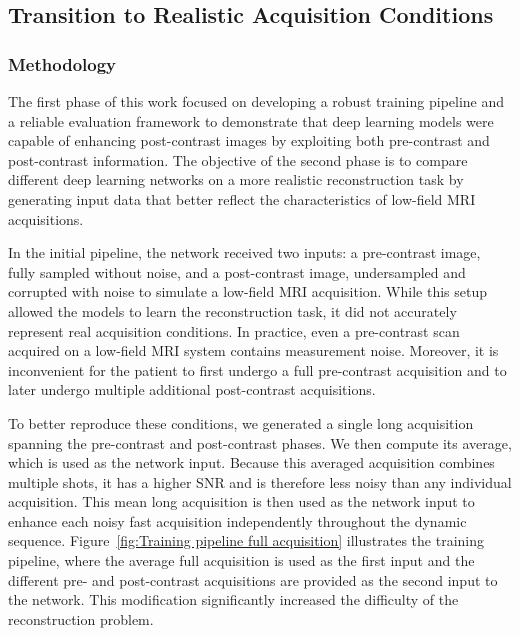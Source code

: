 \documentclass[12pt]{article}
\begin{document}
\subsection{Transition to Realistic Acquisition Conditions} 

\subsubsection{Methodology} 

The first phase of this work focused on developing a robust training pipeline and a reliable evaluation framework to demonstrate that deep learning models were capable of enhancing post-contrast images by exploiting both pre-contrast and post-contrast information.
The objective of the second phase is to compare different deep learning networks on a more realistic reconstruction task by generating input data that better reflect the characteristics of low-field MRI acquisitions.
\vspace{0.5cm}

In the initial pipeline, the network received two inputs: a pre-contrast image, fully sampled without noise, and a post-contrast image, undersampled and corrupted with noise to simulate a low-field MRI acquisition. 
While this setup allowed the models to learn the reconstruction task, it did not accurately represent real acquisition conditions. 
In practice, even a pre-contrast scan acquired on a low-field MRI system contains measurement noise.
Moreover, it is inconvenient for the patient to first undergo a full pre-contrast acquisition and to later undergo multiple additional post-contrast acquisitions.
\vspace{0.5cm}

To better reproduce these conditions, we generated a single long acquisition spanning the pre-contrast and post-contrast phases.
We then compute its average, which is used as the network input.
Because this averaged acquisition combines multiple shots, it has a higher SNR and is therefore less noisy than any individual acquisition.
This mean long acquisition is then used as the network input to enhance each noisy fast acquisition independently throughout the dynamic sequence.
Figure~\ref{fig:Training pipeline full acquisition} illustrates the training pipeline, where the average full acquisition is used as the first input and the different pre- and post-contrast acquisitions are provided as the second input to the network.
This modification significantly increased the difficulty of the reconstruction problem.
\vspace{0.5cm}
\end{document}
